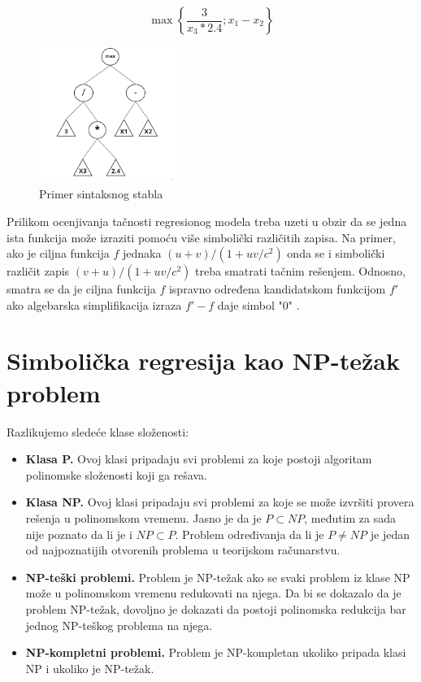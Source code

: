 \documentclass[main.tex]{subfiles}
\begin{document}
\[ \max \left\{\frac{3}{x_{3} * 2.4} ; x_{1}-x_{2}\right\} \]


\begin{figure}[!ht]
\begin{center}
\includegraphics[width=0.4\textwidth]{../images/syntax_tree.jpg}
\end{center}
\caption{Primer sintaksnog stabla}
\label{fig:syntaxTree1}
\end{figure}

Prilikom ocenjivanja tačnosti regresionog modela treba uzeti u obzir da se jedna ista funkcija može izraziti pomoću više simbolički različitih zapisa. Na primer, ako je ciljna funkcija $f$ jednaka $(u + v) / (1 + uv/c^{2})$ onda se i simbolički različit zapis $(v + u) / (1 + uv/c^{2})$ treba smatrati tačnim rešenjem. Odnosno, smatra se da je ciljna funkcija $f$ ispravno određena kandidatskom funkcijom $f'$ ako algebarska simplifikacija izraza $f' - f$ daje simbol "0" \cite{AIFeynman}. 


\section{Simbolička regresija kao NP-težak problem}
\label{sec:np}

Razlikujemo sledeće klase složenosti:
\begin{itemize}
\item \textbf{Klasa P.} Ovoj klasi pripadaju svi problemi za koje postoji algoritam polinomske složenosti koji ga rešava.
\item \textbf{Klasa NP.} Ovoj klasi pripadaju svi problemi za koje se može izvršiti provera rešenja u polinomskom vremenu. Jasno je da je $P \subset NP$, međutim za sada nije poznato da li je i $NP \subset P$. Problem određivanja da li je $P \neq NP$ je jedan od najpoznatijih otvorenih problema u teorijskom računarstvu.
\item \textbf{NP-teški problemi.} Problem je NP-težak ako se svaki problem iz klase NP može u polinomskom vremenu redukovati na njega. Da bi se dokazalo da je problem NP-težak, dovoljno je dokazati da postoji polinomska redukcija bar jednog NP-teškog problema na njega.
\item \textbf{NP-kompletni problemi.} Problem je NP-kompletan ukoliko pripada klasi NP i ukoliko je NP-težak.
\end{itemize}
\end{document}
